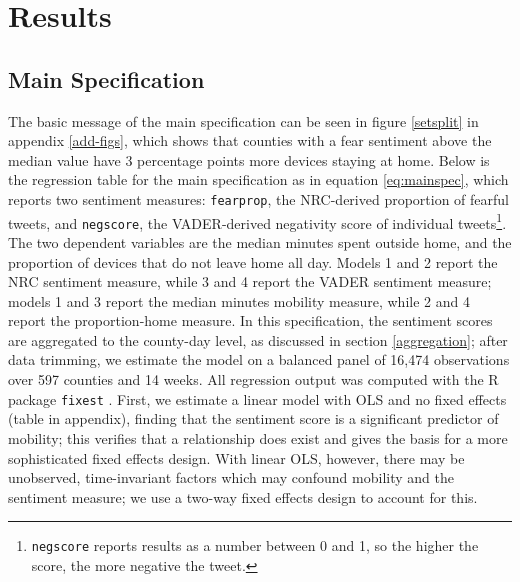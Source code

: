 \documentclass{article}
\begin{document}
\section{Results}%
\subsection{Main Specification}
The basic message of the main specification can be seen in figure \ref{setsplit} in appendix \ref{add-figs}, which shows that counties with a fear sentiment above the median value have 3 percentage points more devices staying at home. Below is the regression table for the main specification as in equation \ref{eq:mainspec}, which reports two sentiment measures: \texttt{fearprop}, the NRC-derived proportion of fearful tweets, and \texttt{negscore}, the VADER-derived negativity score of individual tweets\footnote{\texttt{negscore} reports results as a number between 0 and 1, so the higher the score, the more negative the tweet.}. The two dependent variables are the median minutes spent outside home, and the proportion of devices that do not leave home all day. Models 1 and 2 report the NRC sentiment measure, while 3 and 4 report the VADER sentiment measure; models 1 and 3 report the median minutes mobility measure, while 2 and 4 report the proportion-home measure. In this specification, the sentiment scores are aggregated to the county-day level, as discussed in section \ref{aggregation}; after data trimming, we estimate the model on a balanced panel of 16,474 observations over 597 counties and 14 weeks. All regression output was computed with the R package \texttt{fixest} \parencite{bergeEfficientEstimationMaximum2018}. First, we estimate a linear model with OLS and no fixed effects (table in appendix), finding that the sentiment score is a significant predictor of mobility; this verifies that a relationship does exist and gives the basis for a more sophisticated fixed effects design. With linear OLS, however, there may be unobserved, time-invariant factors which may confound mobility and the sentiment measure; we use a two-way fixed effects design to account for this. 
\end{document}
